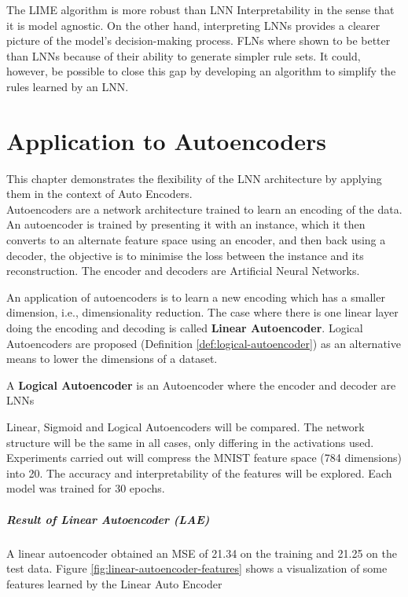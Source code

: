 The LIME algorithm is more robust than LNN Interpretability in the sense that it is model agnostic. On the other hand, interpreting LNNs provides a clearer picture of the model's decision-making process. FLNs where shown to be better than LNNs because of their ability to generate simpler rule sets. It could, however, be possible to close this gap by developing an algorithm to simplify the rules learned by an LNN.

\chapter{Application to Autoencoders} \label{C:lnn-application}
This chapter demonstrates the flexibility of the LNN architecture by applying them in the context of Auto Encoders. \\



Autoencoders \cite{baldi2012complex} \cite{hinton2006reducing} are a network architecture trained to learn an encoding of the data. An autoencoder is trained by presenting it with an instance, which it then converts to an alternate feature space using an encoder, and then back using a decoder, the objective is to minimise the loss between the instance and its reconstruction. The encoder and decoders are Artificial Neural Networks. 

An application of autoencoders is to learn a new encoding which has a smaller dimension, i.e., dimensionality reduction. The case where there is one linear layer doing the encoding and decoding is called \textbf{Linear Autoencoder}. Logical Autoencoders are proposed (Definition \ref{def:logical-autoencoder}) as an alternative means to lower the dimensions of a dataset.

\begin{definition} \label{def:logical-autoencoder}
	A \textbf{Logical Autoencoder} is an Autoencoder where the encoder and decoder are LNNs
\end{definition}

Linear, Sigmoid and Logical Autoencoders will be compared. The network structure will be the same in all cases, only differing in the activations used. Experiments carried out will compress the MNIST feature space (784 dimensions) into 20. The accuracy and interpretability of the features will be explored. Each model was trained for 30 epochs.

\paragraph{Result of Linear Autoencoder (LAE)}
A linear autoencoder obtained an MSE of 21.34 on the training and 21.25 on the test data. Figure \ref{fig:linear-autoencoder-features} shows a visualization of some features learned by the Linear Auto Encoder

